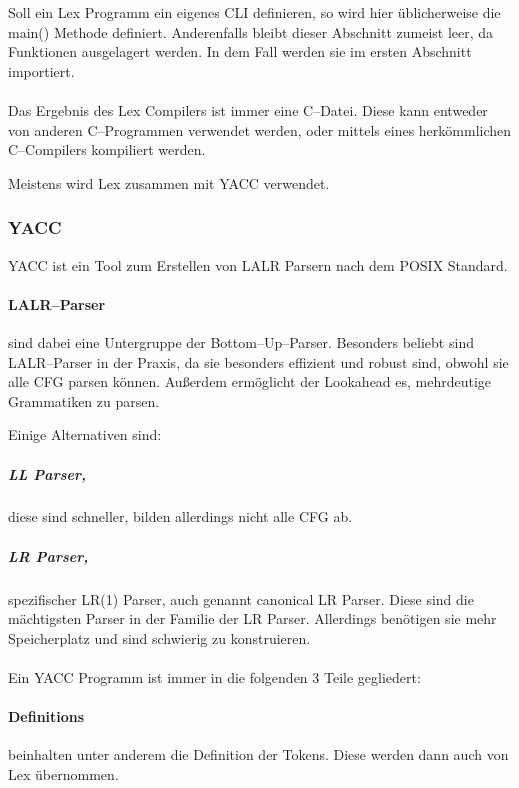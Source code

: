 Soll ein Lex Programm ein eigenes \ac{CLI} definieren, so wird hier üblicherweise die {\ttfamily main()} Methode definiert.
Anderenfalls bleibt dieser Abschnitt zumeist leer, da Funktionen ausgelagert werden.
In dem Fall werden sie im ersten Abschnitt importiert.

\paragraph*{}
Das Ergebnis des Lex Compilers ist immer eine C--Datei.
Diese kann entweder von anderen C--Programmen verwendet werden, oder mittels eines herkömmlichen C--Compilers kompiliert werden.

Meistens wird Lex zusammen mit \ac{YACC} verwendet.

\subsubsection{\acs{YACC}}
\ac{YACC} ist ein Tool zum Erstellen von \ac{LALR} Parsern nach dem \ac{POSIX} Standard.

\paragraph{\acs{LALR}--Parser} sind dabei eine Untergruppe der Bottom--Up--Parser.
Besonders beliebt sind \acs{LALR}--Parser in der Praxis, da sie besonders effizient und robust sind, obwohl sie alle \ac{CFG} parsen können.
Außerdem ermöglicht der Lookahead es, mehrdeutige Grammatiken zu parsen.

Einige Alternativen sind:

\subparagraph{\ac{LL} Parser,} diese sind schneller, bilden allerdings nicht alle \ac{CFG} ab.

\subparagraph{\ac{LR} Parser,} spezifischer LR(1) Parser, auch genannt canonical \acs{LR} Parser.
Diese sind die mächtigsten Parser in der Familie der \ac{LR} Parser.
Allerdings benötigen sie mehr Speicherplatz und sind schwierig zu konstruieren.

\paragraph*{}
Ein \ac{YACC} Programm ist immer in die folgenden 3 Teile gegliedert:


\paragraph{Definitions} beinhalten unter anderem die Definition der Tokens.
Diese werden dann auch von Lex übernommen.

